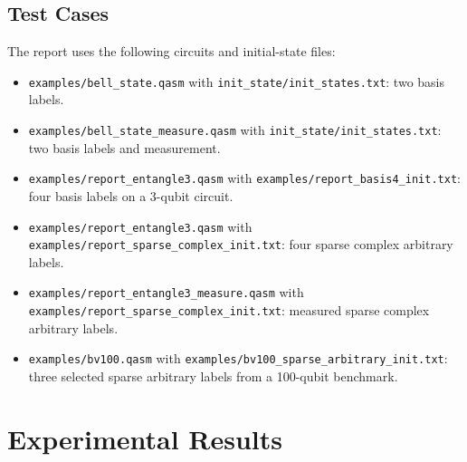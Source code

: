 \documentclass[sigconf,nonacm]{acmart}
\begin{document}
\subsection{Test Cases}
The report uses the following circuits and initial-state files:
\begin{itemize}
  \item \texttt{examples/bell\_state.qasm} with \texttt{init\_state/init\_states.txt}: two basis labels.
  \item \texttt{examples/bell\_state\_measure.qasm} with \texttt{init\_state/init\_states.txt}: two basis labels and measurement.
  \item \texttt{examples/report\_entangle3.qasm} with \texttt{examples/report\_basis4\_init.txt}: four basis labels on a 3-qubit circuit.
  \item \texttt{examples/report\_entangle3.qasm} with \texttt{examples/report\_sparse\_complex\_init.txt}: four sparse complex arbitrary labels.
  \item \texttt{examples/report\_entangle3\_measure.qasm} with \texttt{examples/report\_sparse\_complex\_init.txt}: measured sparse complex arbitrary labels.
  \item \texttt{examples/bv100.qasm} with \texttt{examples/bv100\_sparse\_arbitrary\_init.txt}: three selected sparse arbitrary labels from a 100-qubit benchmark.
\end{itemize}

\section{Experimental Results}
\end{document}
